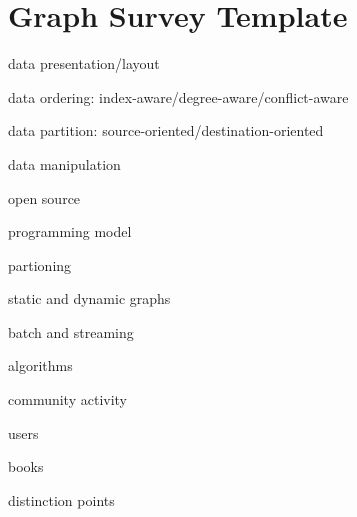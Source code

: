 \documentclass[UTF8,12pt,a4paper]{article}
\begin{document}
\section{Graph Survey Template}
\begin{compactitem}
  \item data presentation/layout
  \item data ordering: index-aware/degree-aware/conflict-aware
  \item data partition: source-oriented/destination-oriented
  \item data manipulation
  \item open source
  \item programming model
  \item partioning
  \item static and dynamic graphs
  \item batch and streaming
  \item algorithms
  \item community activity
  \item users
  \item books 
  \item distinction points
\end{compactitem}
\clearpage



\newpage
\end{document}
